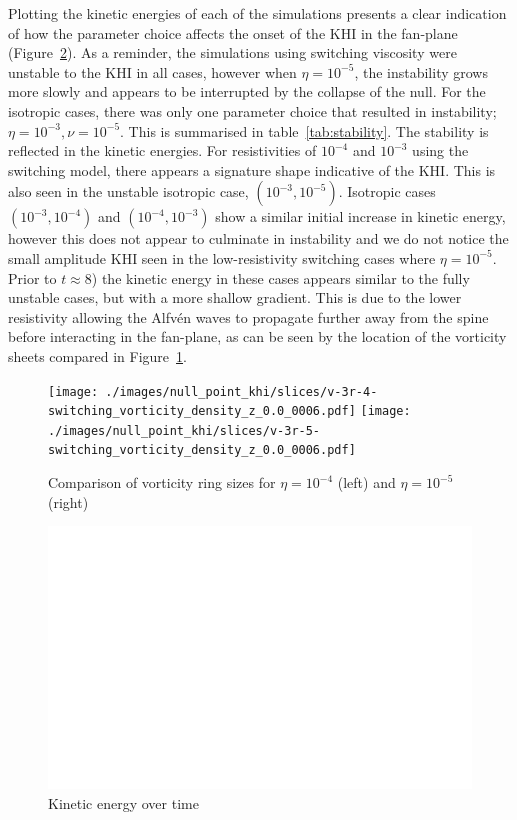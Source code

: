 Plotting the kinetic energies of each of the simulations presents a clear indication of how the parameter choice affects the onset of the KHI in the fan-plane (Figure~\ref{fig:kinetic_energy_over_time_parameter}). As a reminder, the simulations using switching viscosity were unstable to the KHI in all cases, however when $\eta = 10^{-5}$, the instability grows more slowly and appears to be interrupted by the collapse of the null. For the isotropic cases, there was only one parameter choice that resulted in instability; $\eta=10^{-3}, \nu=10^{-5}$. This is summarised in table~\ref{tab:stability}. The stability is reflected in the kinetic energies. For resistivities of $10^{-4}$ and $10^{-3}$ using the switching model, there appears a signature shape indicative of the KHI. This is also seen in the unstable isotropic case, $(10^{-3}, 10^{-5})$. Isotropic cases $(10^{-3}, 10^{-4})$ and $(10^{-4}, 10^{-3})$ show a similar initial increase in kinetic energy, however this does not appear to culminate in instability and we do not notice the small amplitude KHI seen in the low-resistivity switching cases where $\eta=10^{-5}$. Prior to $t\approx 8$) the kinetic energy in these cases appears similar to the fully unstable cases, but with a more shallow gradient. This is due to the lower resistivity allowing the Alfv\'en waves to propagate further away from the spine before interacting in the fan-plane, as can be seen by the location of the vorticity sheets compared in Figure~\ref{fig:low_resistivity_voriticy_ring}.

\begin{figure}[h]
  \centering
  \texttt{[image: ./images/null\_point\_khi/slices/v-3r-4-switching\_vorticity\_density\_z\_0.0\_0006.pdf]}
  \texttt{[image: ./images/null\_point\_khi/slices/v-3r-5-switching\_vorticity\_density\_z\_0.0\_0006.pdf]}
  \caption{Comparison of vorticity ring sizes for $\eta = 10^{-4}$ (left) and $\eta = 10^{-5}$ (right)}
  \label{fig:low_resistivity_voriticy_ring}
\end{figure}

\begin{figure}[h]
  \centering
  \includegraphics[width=0.8\linewidth]{./images/null_point_khi/energy_plots/parameter_study/kinetic_energy_over_time.png}
  \caption{Kinetic energy over time}%
  \label{fig:kinetic_energy_over_time_parameter}
\end{figure}

